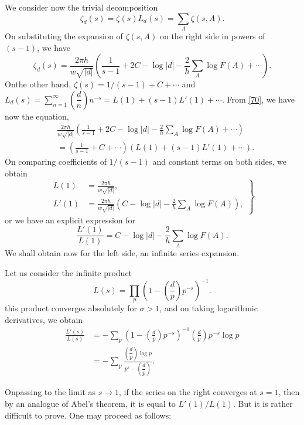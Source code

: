 We consider now the trivial decomposition
$$
\zeta_{d}(s)=\zeta(s)L_{d}(s)=\sum_{A}\zeta(s,A).
$$
On substituting the expansion of $\zeta(s,A)$ on the right side in
powers of $(s-1)$, we have
\begin{equation*}
\zeta_{d}(s)=\frac{2\pi
  h}{w\sqrt{|d|}}\left(\frac{1}{s-1}+2C-\log|d|-\frac{2}{h}\sum_{A}\log
F(A)+\cdots\right).\tag{70}\label{70} 
\end{equation*}
On\pageoriginale the other hand, $\zeta(s)=1/(s-1)+C+\cdots$ and
$L_{d}(s)=\sum\limits^{\infty}_{n=1}\left(\dfrac{d}{n}\right)n^{-s}=L(1)+(s-1)L'(1)+\cdots$. From
\eqref{70}, we have now the equation,
\begin{align*}
& \frac{2\pi
  h}{w\sqrt{|d|}}\left(\frac{1}{s-1}+2C-\log|d|-\frac{2}{h}\sum_{A}\log
F(A)+\cdots\right)\\
& =\left(\frac{1}{s-1}+C+\cdots\right)(L(1)+(s-1)L'(1)+\cdots).
\end{align*}
On comparing coefficients of $1/(s-1)$ and constant terms on both
sides, we obtain
\begin{equation*}
\left.
\begin{split}
L(1) &= \frac{2\pi h}{w\sqrt{|d|}},\\
L'(1) &= \frac{2\pi
  h}{w\sqrt{|d|}}\left(C-\log|d|-\frac{2}{h}\sum_{A}\log F(A)\right),
\end{split}\right\}\tag{71}\label{71}
\end{equation*}
or we have an explicit expression for
\begin{equation*}
\frac{L'(1)}{L(1)}=C-\log|d|-\frac{2}{h}\sum_{A}\log
F(A).\tag*{$(71)'$}\label{71'} 
\end{equation*}
We shall obtain now for the left side, an infinite series expansion.

Let us consider the infinite product
$$
L(s)=\prod_{p}\left(1-\left(\frac{d}{p}\right)p^{-s}\right)^{-1}.
$$
this product converges absolutely for $\sigma>1$, and on taking
logarithmic derivatives, we obtain
\begin{align*}
\frac{L'(s)}{L(s)} &=
-\sum_{p}\left(1-\left(\frac{d}{p}\right)p^{-s}\right)^{-1}\left(\frac{d}{p}\right)p^{-s}\log
p\\
&= -\sum_{p}\frac{\left(\dfrac{d}{p}\right)\log
  p}{p^{s}-\left(\dfrac{d}{p}\right)}.\tag{72}\label{72} 
\end{align*}

On\pageoriginale passing to the limit as $s\to 1$, if the series on
the right converges at $s=1$, then by an analogue of Abel's theorem,
it is equal to $L'(1)/L(1)$. But it is rather difficult to prove. One
may proceed as follows:

